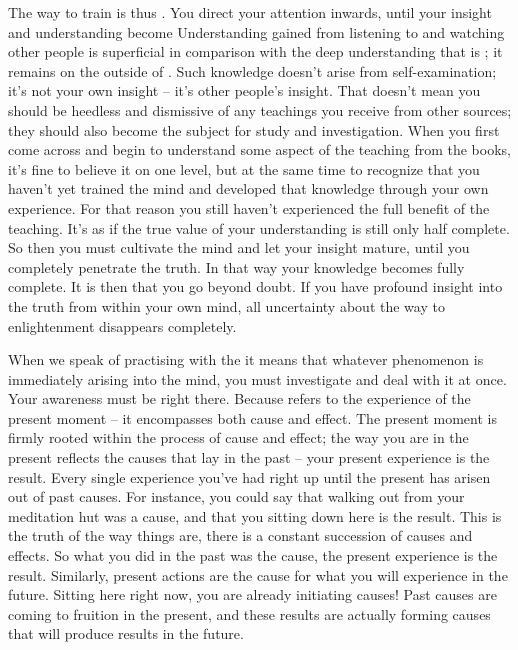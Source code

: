The way to train is thus . You direct your attention inwards, until your insight and understanding become  Understanding gained from listening to and watching other people is superficial in comparison with the deep understanding that is ; it remains on the outside of . Such knowledge doesn't arise from self-examination; it's not your own insight -- it's other people's insight. That doesn't mean you should be heedless and dismissive of any teachings you receive from other sources; they should also become the subject for study and investigation. When you first come across and begin to understand some aspect of the teaching from the books, it's fine to believe it on one level, but at the same time to recognize that you haven't yet trained the mind and developed that knowledge through your own experience. For that reason you still haven't experienced the full benefit of the teaching. It's as if the true value of your understanding is still only half complete. So then you must cultivate the mind and let your insight mature, until you completely penetrate the truth. In that way your knowledge becomes fully complete. It is then that you go beyond doubt. If you have profound insight into the truth from within your own mind, all uncertainty about the way to enlightenment disappears completely. 

When we speak of practising with the  it means that whatever phenomenon is immediately arising into the mind, you must investigate and deal with it at once. Your awareness must be right there. Because  refers to the experience of the present moment -- it encompasses both cause and effect. The present moment is firmly rooted within the process of cause and effect; the way you are in the present reflects the causes that lay in the past -- your present experience is the result. Every single experience you've had right up until the present has arisen out of past causes. For instance, you could say that walking out from your meditation hut was a cause, and that you sitting down here is the result. This is the truth of the way things are, there is a constant succession of causes and effects. So what you did in the past was the cause, the present experience is the result. Similarly, present actions are the cause for what you will experience in the future. Sitting here right now, you are already initiating causes! Past causes are coming to fruition in the present, and these results are actually forming causes that will produce results in the future. 

